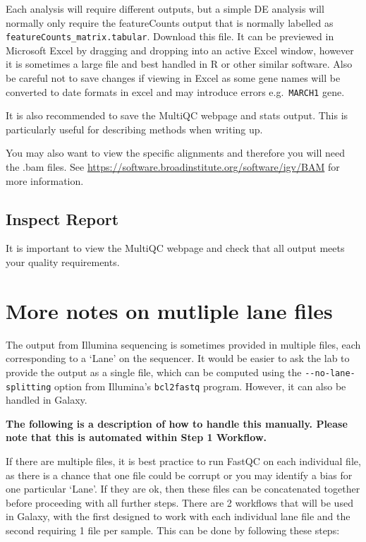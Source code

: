 \documentclass[
]{book}
\begin{document}
Each analysis will require different outputs, but a simple DE analysis will normally only require the featureCounts output that is normally labelled as \texttt{featureCounts\_matrix.tabular}. Download this file. It can be previewed in Microsoft Excel by dragging and dropping into an active Excel window, however it is sometimes a large file and best handled in R or other similar software. Also be careful not to save changes if viewing in Excel as some gene names will be converted to date formats in excel and may introduce errors e.g.~\texttt{MARCH1} gene.

It is also recommended to save the MultiQC webpage and stats output. This is particularly useful for describing methods when writing up.

You may also want to view the specific alignments and therefore you will need the .bam files. See \url{https://software.broadinstitute.org/software/igv/BAM} for more information.

\hypertarget{inspect-report}{%
\section{Inspect Report}\label{inspect-report}}

It is important to view the MultiQC webpage and check that all output meets your quality requirements.

\hypertarget{multiple-lane-files}{%
\chapter{More notes on mutliple lane files}\label{multiple-lane-files}}

The output from Illumina sequencing is sometimes provided in multiple files, each corresponding to a `Lane' on the sequencer. It would be easier to ask the lab to provide the output as a single file, which can be computed using the \texttt{-\/-no-lane-splitting} option from Illumina's \texttt{bcl2fastq} program. However, it can also be handled in Galaxy.

\textbf{The following is a description of how to handle this manually. Please note that this is automated within Step 1 Workflow.}

If there are multiple files, it is best practice to run FastQC on each individual file, as there is a chance that one file could be corrupt or you may identify a bias for one particular `Lane'. If they are ok, then these files can be concatenated together before proceeding with all further steps. There are 2 workflows that will be used in Galaxy, with the first designed to work with each individual lane file and the second requiring 1 file per sample. This can be done by following these steps:
\end{document}
